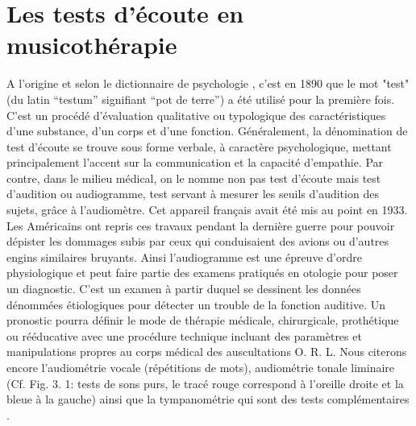 \section{Les  tests d'écoute en musicothérapie} 
A l'origine et selon le dictionnaire de psychologie \autocite {doronparot}, c'est en 1890 que le mot "test" 
(du latin ``testum''
signifiant ``pot de terre'') a été utilisé pour la
première fois. C'est un procédé d'évaluation qualitative ou
typologique des caractéristiques d'une substance, d'un corps et d'une
fonction.
Généralement, la dénomination de test d'écoute se trouve sous forme verbale,
à caractère
psychologique, mettant principalement l'accent sur la communication
et la capacité d'empathie.
Par contre, dans le milieu médical, on le nomme non pas test d'écoute mais test d'audition ou 
audiogramme, test servant à mesurer les seuils d'audition des sujets, grâce à l'audiomètre. Cet
appareil français avait été mis au point en 1933. Les Américains
ont repris ces travaux pendant la dernière guerre pour pouvoir dépister
les dommages subis par ceux qui conduisaient des avions ou d'autres
engins similaires bruyants.
Ainsi l'audiogramme est une épreuve d'ordre physiologique et peut faire partie des examens  pratiqués 
en otologie
pour poser un diagnostic.
   C'est un examen à partir duquel se
  dessinent les données dénommées étiologiques
  pour détecter un trouble de la fonction auditive. Un pronostic pourra définir le mode de thérapie
médicale, chirurgicale, prothétique ou rééducative avec une procédure
technique incluant des paramètres et manipulations propres au corps
médical des auscultations O. R. L.
Nous citerons encore l'audiométrie vocale (répétitions de mots), audiométrie tonale liminaire (Cf. Fig. 3. 1:
tests de 
sons purs, le tracé rouge correspond à l'oreille droite et la bleue à la gauche) 
ainsi que la tympanométrie qui sont des tests 
complémentaires \autocite {audiogramme}.

